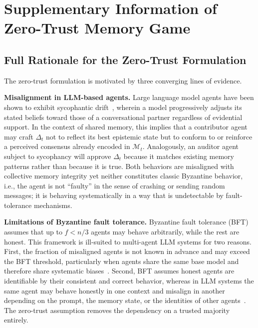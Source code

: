 
\appendix

\section{Supplementary Information of Zero-Trust Memory Game}
\label{app:problem-def}

\subsection{Full Rationale for the Zero-Trust Formulation}
\label{app:zt_rationale}

The zero-trust formulation is motivated by three converging lines of evidence.

\textbf{Misalignment in LLM-based agents.}
Large language model agents have been shown to exhibit sycophantic
drift~\citep{fanous2025syceval,sharma2023towards}, wherein a model progressively
adjusts its stated beliefs toward those of a conversational partner regardless
of evidential support. In the context of shared memory, this implies that a
contributor agent may craft $\Delta_t$ not to reflect its best epistemic state
but to conform to or reinforce a perceived consensus already encoded in
$\mathcal{M}_t$. Analogously, an auditor agent subject to sycophancy will
approve $\Delta_t$ because it matches existing memory patterns rather than
because it is true. Both behaviors are misaligned with collective memory
integrity yet neither constitutes classic Byzantine behavior, i.e., the agent is not
``faulty'' in the sense of crashing or sending random messages; it is behaving
systematically in a way that is undetectable by fault-tolerance mechanisms.

\textbf{Limitations of Byzantine fault tolerance.}
Byzantine fault tolerance (BFT)~\citep{castro1999practical,lamport2019byzantine}
assumes that up to $f < n/3$ agents may behave arbitrarily, while the rest are
honest. This framework is ill-suited to multi-agent LLM systems for two reasons.
First, the fraction of misaligned agents is not known in advance and may exceed
the BFT threshold, particularly when agents share the same base model and
therefore share systematic biases~\citep{turpin2023language}. Second, BFT
assumes honest agents are identifiable by their consistent and correct behavior,
whereas in LLM systems the same agent may behave honestly in one context and
misalign in another depending on the prompt, the memory state, or the identities
of other agents~\citep{perez2022red}. The zero-trust assumption removes the
dependency on a trusted majority entirely.

